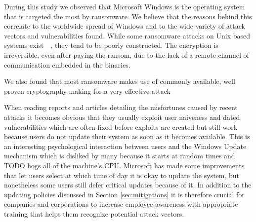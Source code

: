 \documentclass[10pt,a4paper]{article}
\begin{document}
{
\color{red}
During this study we observed that Microsoft Windows is the operating system that is targeted the most by ransomware. We believe that the reasons behind this correlate to the worldwide spread of Windows and to the wide variety of attack vectors and vulnerabilities found. While some ransomware attacks on Unix based systems exist~\cite{linuxRansomware}~\cite{osxRansomware}, they tend to be poorly constructed. The encryption is irreversible, even after paying the ransom, due to the lack of a remote channel of communication embedded in the binaries.

We also found that most ransomware makes use of commonly available, well proven cryptography making for a very effective attack %

When reading reports and articles detailing the misfortunes caused by recent attacks it becomes obvious that they usually exploit user naiveness and dated vulnerabilities which are often fixed before exploits are created but still work because users do not update their system as soon as it becomes available. This is an interesting psychological interaction between users and the Windows Update mechanism which is disliked by many because it starts at random times and TODO hogs all of the machine's CPU. Microsoft has made some improvements that let users select at which time of day it is okay to update the system, but nonetheless some users still defer critical updates because of it. In addition to the updating policies discussed in Section \ref{sec:mitigations} it is therefore crucial for companies and corporations to increase employee awareness with appropriate training that helps them recognize potential attack vectors.
}

\end{document}
